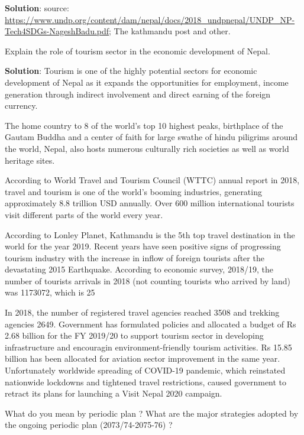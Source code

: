 \documentclass[
  openany]{book}
\newcommand{\question}{\item}
\newenvironment{solution}{ {\bfseries Solution}:}{}
\begin{document}
\begin{questions}
\begin{solution}
source: \url{https://www.undp.org/content/dam/nepal/docs/2018_undpnepal/UNDP_NP-Tech4SDGs-NageshBadu.pdf}; The kathmandu post and other.
\end{solution}

\question Explain the role of tourism sector in the economic development of Nepal.

\begin{solution}
Tourism is one of the highly potential sectors for economic development of Nepal as it expands the opportunities for employment, income generation through indirect involvement and direct earning of the foreign currency.

The home country to 8 of the world's top 10 highest peaks, birthplace of the Gautam Buddha and a center of faith for large swathe of hindu piligrims around the world, Nepal, also hosts numerous culturally rich societies as well as world heritage sites.

According to World Travel and Tourism Council (WTTC) annual report in 2018, travel and tourism is one of the world's booming industries, generating approximately 8.8 trillion USD annually. Over 600 million international tourists visit different parts of the world every year.

According to Lonley Planet, Kathmandu is the 5th top travel destination in the world for the year 2019. Recent years have seen positive signs of progressing tourism industry with the increase in inflow of foreign tourists after the devastating 2015 Earthquake. According to economic survey, 2018/19, the number of tourists arrivals in 2018 (not counting tourists who arrived by land) was 1173072, which is 25%

In 2018, the number of registered travel agencies reached 3508 and trekking agencies 2649. Government has formulated policies and allocated a budget of Rs 2.68 billion for the FY 2019/20 to support tourism sector in developing infrastructure and encouragin environment-friendly tourism activities. Rs 15.85 billion has been allocated for aviation sector improvement in the same year. Unfortunately worldwide spreading of COVID-19 pandemic, which reinstated nationwide lockdowns and tightened travel restrictions, caused government to retract its plans for launching a Visit Nepal 2020 campaign.

\end{solution}

\question What do you mean by periodic plan ? What are the major strategies adopted by the ongoing periodic plan (2073/74-2075-76) ?


\end{questions}
\end{document}
